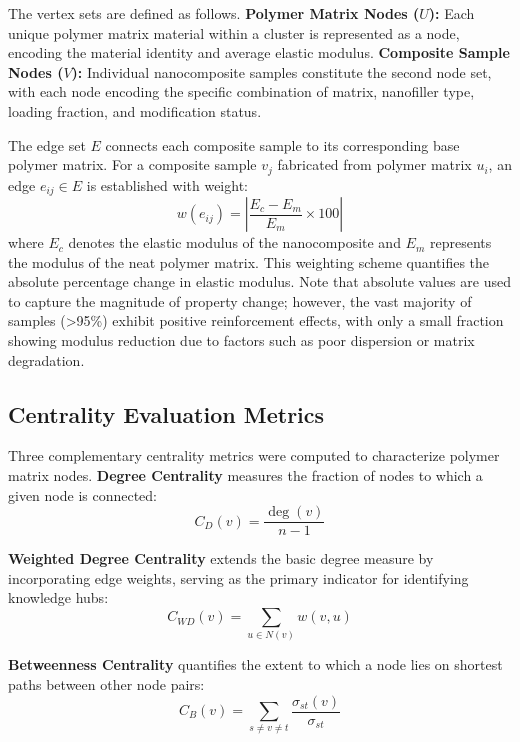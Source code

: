 \documentclass[conference]{IEEEtran}
\begin{document}
The vertex sets are defined as follows. \textbf{Polymer Matrix Nodes ($U$):} Each unique polymer matrix material within a cluster is represented as a node, encoding the material identity and average elastic modulus. \textbf{Composite Sample Nodes ($V$):} Individual nanocomposite samples constitute the second node set, with each node encoding the specific combination of matrix, nanofiller type, loading fraction, and modification status.

The edge set $E$ connects each composite sample to its corresponding base polymer matrix. For a composite sample $v_j$ fabricated from polymer matrix $u_i$, an edge $e_{ij} \in E$ is established with weight:
\begin{equation}
w(e_{ij}) = \left| \frac{E_c - E_m}{E_m} \times 100 \right|
\end{equation}
where $E_c$ denotes the elastic modulus of the nanocomposite and $E_m$ represents the modulus of the neat polymer matrix. This weighting scheme quantifies the absolute percentage change in elastic modulus. Note that absolute values are used to capture the magnitude of property change; however, the vast majority of samples (>95\%) exhibit positive reinforcement effects, with only a small fraction showing modulus reduction due to factors such as poor dispersion or matrix degradation.

\subsection{Centrality Evaluation Metrics}

Three complementary centrality metrics were computed to characterize polymer matrix nodes. \textbf{Degree Centrality} measures the fraction of nodes to which a given node is connected:
\begin{equation}
C_D(v) = \frac{\deg(v)}{n-1}
\end{equation}

\textbf{Weighted Degree Centrality} extends the basic degree measure by incorporating edge weights, serving as the primary indicator for identifying knowledge hubs:
\begin{equation}
C_{WD}(v) = \sum_{u \in N(v)} w(v, u)
\end{equation}

\textbf{Betweenness Centrality} quantifies the extent to which a node lies on shortest paths between other node pairs:
\begin{equation}
C_B(v) = \sum_{s \neq v \neq t} \frac{\sigma_{st}(v)}{\sigma_{st}}
\end{equation}
\end{document}
